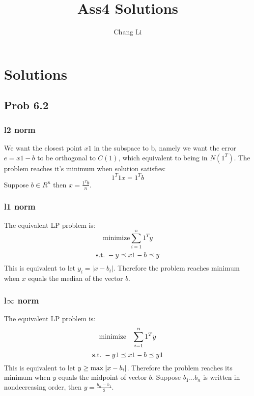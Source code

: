 \message{ !name(ass4_ChangLi.tex)}\documentclass[10pt,a4paper]{article}
\begin{document}

\title{Ass4 Solutions}
\author{Chang Li}
\maketitle

\section{Solutions}

\subsection{Prob 6.2}

\subsubsection{l2 norm}
We want the closest point $x1$ in the subspace to b, namely
we want the error $e = x1 - b$ to be orthogonal to $C(1)$,
which equivalent to being in $N(1^T)$. The problem reaches
it's minimum when solution satisfies:
$$
1^T1x=1^Tb
$$
Suppose $b\in R^n$ then $x=\frac{1^Tb}{n}$.

\subsubsection{l1 norm}
The equivalent LP problem is:
$$
\text{minimize} \sum_{i=1}^n 1^Ty
$$
$$
\text{s.t.\;}  -y \preceq x1-b \preceq y
$$
This is equivalent to let $y_i = |x - b_i|$. Therefore the problem
reaches minimum when $x$ equals the median of the vector $b$.



\subsubsection{l$\infty$ norm}

The equivalent LP problem is:
$$
\text{minimize \;\;}\sum_{i=1}^n 1^Ty
$$
$$
\text{s.t.\;}  -y1 \preceq x1-b \preceq y1
$$
This is equivalent to let $y \geq \text{max\;}|x - b_i|$.
Therefore the problem reaches its minimum when $y$ equals
the midpoint of vector $b$. Suppose $b_1 \dots b_n$ is
written in nondecreasing order, then $y=\frac{b_n-b_1}{2}$.
\end{document}
